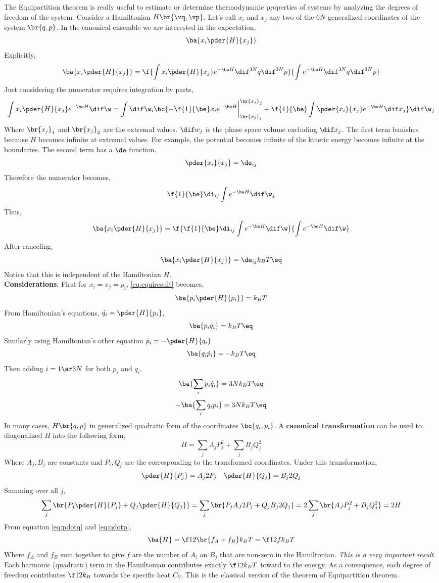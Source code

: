 \documentclass{article}
\begin{document}
{The Equipartition theorem is really useful to estimate or determine thermodynamic properties of systems by analyzing the degrees of freedom of the system. Consider a Hamiltonian $H \br{\vq, \vp}$. Let's call $x_i$ and $x_j$ any two of the $6N$ generalized coordinates of the system $\br{q,p}$. In the canonical ensemble we are interested in the expectation,
\[ \ba{x_i \pder{H}{x_j}} \]
Explicitly,
\[ \ba{x_i \pder{H}{x_j}} = \f{\int x_i \pder{H}{x_j} e^{-\be H} \dif^{3N} q \dif^{3N} p}{\int e^{-\be H} \dif^{3N} q \dif^{3N} p} \]
Just considering the numerator requires integration by parts,
\[ \int x_i \pder{H}{x_j} e^{-\be H} \dif \w = \int \dif \w_i\bc{ - \f{1}{\be} x_i e^{-\be H}\bigg\rvert_{\br{x_j}_1}^{\br{x_j}_2} + \f{1}{\be}\int  \pder{x_i}{x_j} e^{-\be H} \dif x_j} \dif \w_j  \]
Where $\br{x_j}_1$ and $\br{x_j}_2$ are the extremal values. $\dif w_j$ is the phase space volume excluding $\dif x_j$. The first term banishes because $H$ becomes infinite at extremal values. For example, the potential becomes infinite of the kinetic energy becomes infinite at the boundaries. The second term has a $\de$ function.
\[ \pder{x_i}{x_j} = \de_{ij} \]
Therefore the numerator becomes,
\[ \f{1}{\be} \di_{ij} \int e^{-\be H} \dif \w_j \]
Thus,
\[ \ba{x_i \pder{H}{x_j}} = \f{\f{1}{\be} \di_{ij} \int e^{-\be H} \dif \w}{\int e^{-\be H} \dif \w} \]
After canceling,
\[\ba{x_i \pder{H}{x_j}} = \de_{ij} k_B T \eq \label{eq:equiresult}\]
Notice that this is independent of the Hamiltonian $H$.\\

\textbf{Considerations}:
First for $x_i = x_j = p_i$, \eqref{eq:equiresult} becomes,
\[\ba{p_i \pder{H}{p_i}} = k_B T \]
From Hamiltonian's equations, $\dot{q}_i = \pder{H}{p_i}$,
\[\ba{p_i \dot{q}_i} = k_B T \eq \label{eq:pdotq} \]
Similarly using Hamiltonian's other equation $\dot{p}_i = -\pder{H}{q_i}$
\[\ba{q_i \dot{p}_i} = -k_B T \eq \label{eq:qdotp}\]
Then adding $i=1\ar3N$ for both $p_i$ and $q_i$,
\[ \ba{\sum_i p_i \dot{q}_i} = 3 N k_B T \eq \label{eq:sumpdotq}\]
\[ -\ba{\sum_i q_i \dot{p}_i} = 3 N k_B T \eq \label{eq:sumqdotp}\]
In many cases, $H\br{q,p}$ in generalized quadratic form of the coordinates $\bc{q_i, p_i}$. A \textbf{canonical transformation} can be used to diagonalized $H$ into the following form,
\[ H = \sum_j A_j P_j^2 + \sum_j B_j Q_j^2 \]
Where $A_j, B_j$ are constants and $P_i,Q_i$ are the corresponding to the transformed coordinates. Under this transformation,
\[ \pder{H}{P_j} = A_j 2 P_j \quad \pder{H}{Q_j} = B_j 2 Q_j \]
Summing over all $j$,
\[ \sum_j \br{P_j \pder{H}{P_j} + Q_j \pder{H}{Q_j}} = \sum_j \br{P_j A_J 2 P_j + Q_j B_j 2 Q_j} = 2\sum_j \br{A_J P_j^2 + B_j Q_j^2} = 2H \]
From equation \eqref{eq:pdotq} and \eqref{eq:qdotp},
\[ \ba{H} = \f12 \br{f_A + f_B} k_B T = \f12 f k_B T \]
Where $f_A$ and $f_B$ sum together to give $f$ are the number of $A_i$ an $B_j$ that are non-zero in the Hamiltonian. \textit{This is a very important result}. Each harmonic (quadratic) term in the Hamiltonian contributes exactly $\f12 k_B T$ toward to the energy. As a consequence, each degree of freedom contributes $\f12 k_B$ towards the specific heat $C_V$. This is the classical version of the theorem of Equipartition theorem. \\

}
\end{document}
